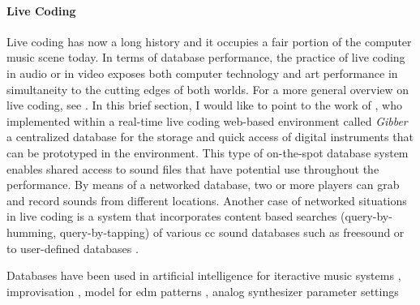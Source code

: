 {	\paragraph{Live Coding}
	Live coding has now a long history and it occupies a fair portion of the computer music scene today. In terms of database performance, the practice of live coding in audio or in video exposes both computer technology and art performance in simultaneity to the cutting edges of both worlds. For a more general overview on live coding, see \parencite{nickcollinsphd, Col03:Liv, Nilson2007, Zmo15:Liv}. In this brief section, I would like to point to the work of \cite{croberts:2014}, who implemented within a real-time live coding web-based environment called \textit{Gibber} a centralized database for the storage and quick access of digital instruments that can be prototyped in the environment. This type of on-the-spot database system enables shared access to sound files that have potential use throughout the performance. By means of a networked database, two or more players can grab and record sounds from different locations. Another case of networked situations in live coding is a system that incorporates content based searches (query-by-humming, query-by-tapping) of various \gls{cc} sound databases such as \gls{freesound} or to user-defined databases \parencite{nime18-Xambo-b}.
}

Databases have been used in artificial intelligence for iteractive music systems \parencite{Row92:Int}, improvisation \parencite{DBLP:conf/icmc/AssayagDD99, DBLP:conf/icmc/BlochD08}, model for \gls{edm} patterns \parencite{rvogl:2017}, analog synthesizer parameter settings \parencite{Loviscach2008}


% 
% 
% 
% 
%  
% 
% 
%  
%  
% 
% 

